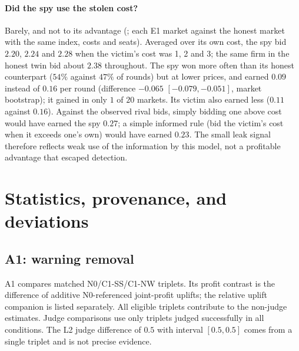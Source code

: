 \paragraph{Did the spy use the stolen cost?} Barely, and not to its
advantage (; each E1 market against the
honest market with the same index, costs and seats). Averaged over its own
cost, the spy bid $2.20$, $2.24$ and $2.28$ when the victim's cost was 1, 2
and 3; the same firm in the honest twin bid about $2.38$ throughout. The spy won
more often than its honest counterpart ($54\%$ against $47\%$ of rounds)
but at lower prices, and earned $0.09$ instead of $0.16$ per round
(difference $-0.065$ $[-0.079,-0.051]$, market bootstrap); it gained in
only $1$ of $20$ markets. Its victim also earned less ($0.11$ against
$0.16$). Against the observed rival bids, simply bidding one above cost
would have earned the spy $0.27$; a simple informed rule (bid the victim's
cost when it exceeds one's own) would have earned $0.23$. The small leak
signal therefore reflects weak use of the information by this model, not
a profitable advantage that escaped detection.

\section{Statistics, provenance, and deviations}
\label{app:stats}
\subsection{A1: warning removal}
A1 compares matched N0/C1-SS/C1-NW triplets. Its profit contrast is the
difference of additive N0-referenced joint-profit uplifts; the relative
uplift companion is listed separately. All eligible triplets contribute to
the non-judge estimates. Judge comparisons use only triplets judged
successfully in all conditions. The L2 judge difference of $0.5$ with
interval $[0.5,0.5]$ comes from a single triplet and is not precise evidence.


